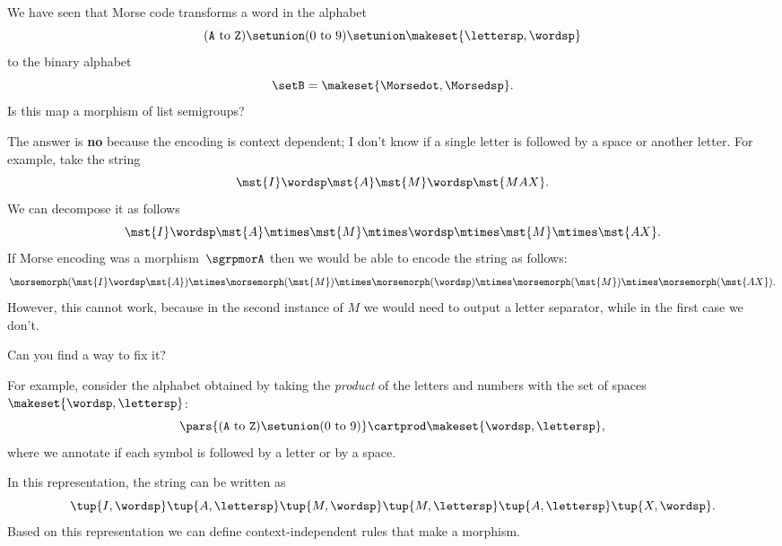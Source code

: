\begin{exercise}
    We have seen that Morse code transforms a word in the alphabet
    \begin{equation}
        (\texttt{A} \ \text{to}\ \texttt{Z})
        \setunion (0 \ \text{to}\ 9) \setunion \makeset{\lettersp, \wordsp}
    \end{equation}
    to the binary alphabet
    \begin{equation}
        \setB = \makeset{\Morsedot, \Morsedsp}.
    \end{equation}
    Is this map a morphism of list semigroups?
\end{exercise}
%
\begin{solution}
    The answer is \textbf{no} because the encoding is context dependent; I don't know if a single letter is followed by a space or another letter.
    For example, take the string
    \begin{equation}
        \label{eq:max-iammax}
        \mst {I} \wordsp \mst{A} \mst{M}\wordsp \mst{MAX}.
    \end{equation}
    We can decompose it as follows
    \begin{equation}
        \label{eq:max-iammax-decomp}
        \mst{I}\wordsp \mst{A}\mtimes \mst{M} \mtimes \wordsp \mtimes \mst{M} \mtimes \mst{AX}.
    \end{equation}
    If Morse encoding was a morphism~$\sgrpmorA$ then we would be able to encode the string as follows:
    \begin{equation}
        \label{eq:max-iammax-decomp-morph}
        \morsemorph(\mst{I}\wordsp \mst{A}) \mtimes \morsemorph (\mst{M}) \mtimes \morsemorph(\wordsp) \mtimes \morsemorph(\mst{M})
        \mtimes \morsemorph(\mst{AX}).
    \end{equation}
    However, this cannot work, because in the second instance of $M$ we would need to output a letter separator, while in the first case we don't.

    Can you find a way to fix it?

    For example, consider the alphabet obtained by taking the \emph{product} of the letters and numbers with the set of spaces~$\makeset{\wordsp, \lettersp}$:
    \begin{equation}
        \pars{ (\texttt{A} \ \text{to}\ \texttt{Z}) \setunion (0 \ \text{to}\ 9) } \cartprod \makeset{\wordsp, \lettersp},
    \end{equation}
    where we annotate if each symbol is followed by a letter or by a space.

    In this representation, the string can be written as
    \begin{equation}
        \tup{I, \wordsp} \tup{A, \lettersp} \tup{M, \wordsp} \tup{M, \lettersp} \tup{A, \lettersp}
        \tup{X, \wordsp}.
    \end{equation}
    Based on this representation we can define context-independent rules that make a morphism.
\end{solution}

